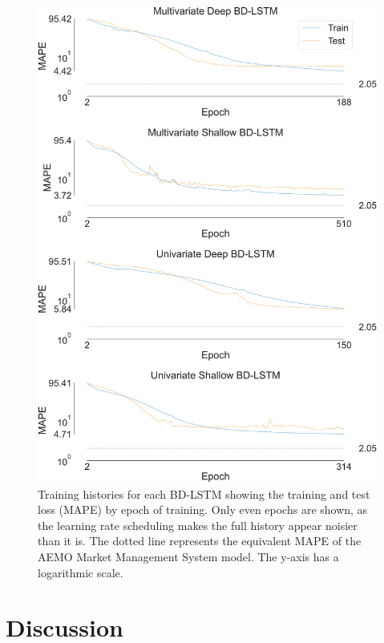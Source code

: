 \documentclass[mstat,12pt]{unswthesis}
\begin{document}
\begin{figure}[H]
\centerline{\includegraphics[width=\columnwidth]{Figures/Plots/BD-LSTM training histories.pdf}}
\caption{Training histories for each BD-LSTM showing the training and test loss (MAPE) by epoch of training. Only even epochs are shown, as the learning rate scheduling makes the full history appear noisier than it is. The dotted line represents the equivalent MAPE of the AEMO Market Management System model. The y-axis has a logarithmic scale.}
\label{lstm_hists}
\end{figure}


\hypertarget{discussion}{%
\chapter{Discussion}\label{discussion}}
\end{document}
